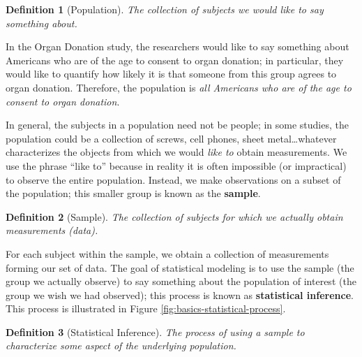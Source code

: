 \documentclass[
]{book}
\theoremstyle{plain}
\theoremstyle{mydefn}
\newtheorem{definition}{Definition}[chapter]
\theoremstyle{myexmpl}
\theoremstyle{remark}
\begin{document}
\begin{definition}[Population]
\protect\hypertarget{def:defn-population}{}{\label{def:defn-population} {} }The collection of subjects we would like to say something about.
\end{definition}

In the Organ Donation study, the researchers would like to say something about Americans who are of the age to consent to organ donation; in particular, they would like to quantify how likely it is that someone from this group agrees to organ donation. Therefore, the population is \emph{all Americans who are of the age to consent to organ donation}.

In general, the subjects in a population need not be people; in some studies, the population could be a collection of screws, cell phones, sheet metal\ldots whatever characterizes the objects from which we would \emph{like to} obtain measurements. We use the phrase ``like to'' because in reality it is often impossible (or impractical) to observe the entire population. Instead, we make observations on a subset of the population; this smaller group is known as the \textbf{sample}.

\begin{definition}[Sample]
\protect\hypertarget{def:defn-sample}{}{\label{def:defn-sample} {} }The collection of subjects for which we actually obtain measurements (data).
\end{definition}

For each subject within the sample, we obtain a collection of measurements forming our set of data. The goal of statistical modeling is to use the sample (the group we actually observe) to say something about the population of interest (the group we wish we had observed); this process is known as \textbf{statistical inference}. This process is illustrated in Figure \ref{fig:basics-statistical-process}.

\begin{definition}[Statistical Inference]
\protect\hypertarget{def:defn-inference}{}{\label{def:defn-inference} {} }The process of using a sample to characterize some aspect of the underlying population.
\end{definition}
\end{document}
